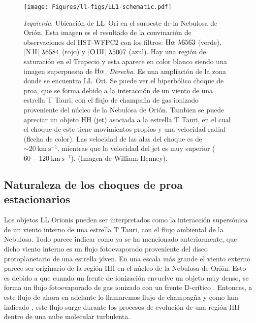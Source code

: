 \begin{figure}
  \centering
  \texttt{[image: Figures/ll-figs/LL1-schematic.pdf]}
  \caption{\textit{Izquierda}. Ubicación de LL~Ori en el suroeste de la Nebulosa de Orión. Esta imagen es el resultado de la convinación de observaciones del HST-WFPC2 \citep{Odell:1996} con los filtros: \(\mathrm{H}\alpha~\lambda6563\) (verde), \(\mathrm{[N\,II]}~\lambda6584\) (rojo) y \(\mathrm{[O\,III]}~\lambda5007\) (azul). Hay una región de saturación en el Trapecio y esta aparece en color blanco siendo una imagen superpuesta de \(\mathrm{H}\alpha\). \textit{Derecha}. Es una ampliación de la zona donde se encuentra LL~Ori. Se puede ver el hiperbólico choque de proa, que se forma debido a la interacción de un viento de una estrella T Tauri, con  el flujo de champaña de gas ionizado  proveniente del núcleo de la Nebulosa de Orión. Tambien se puede apreciar un objeto HH (jet) asociada a la  estrella T Tauri, en  el cual el choque de este tiene movimientos propios \citep{Henney:2013a} y una velocidad radial (flecha de color). Las velocidad de las alas del choque es de \(\sim 20 ~\text{km}~\text{s}^{-1}\), mientras que la velocidad del jet es muy superior (\(60-120 ~\text{km}~\text{s}^{-1}\)). (Imagen de William Henney). }
  \label{fig:LL1}
\end{figure}

\subsection{Naturaleza de los choques de proa estacionarios }
\label{sec:choques}

Los objetos LL Orionis pueden ser interpretados como la interacción supersónica de un viento interno de una estrella T Tauri, con el flujo ambiental de la Nebulosa. Todo parece indicar como ya se ha mencionado anteriormente, que dicho viento interno es un flujo fotoevaporado proveniente del disco protoplanetario de una estrella jóven. En una escala más grande el viento externo parece ser originario de la  región HII en el núcleo de la Nebulosa de Orión. Esto es debido a que cuando un frente de ionización envuelve un objeto muy denso, se forma un flujo fotoevaporado de gas ionizado con un frente D-crítico \citep{Dyson:1968}. Entonces, a este flujo de ahora en adelante lo llamaremos flujo de champagña y como han indicado \citet{Mellema:2006, Arthur:2011, Ercolano:2012}, este flujo surge durante los procesos de evolución de una región HII dentro de una nube molecular turbulenta.\\

